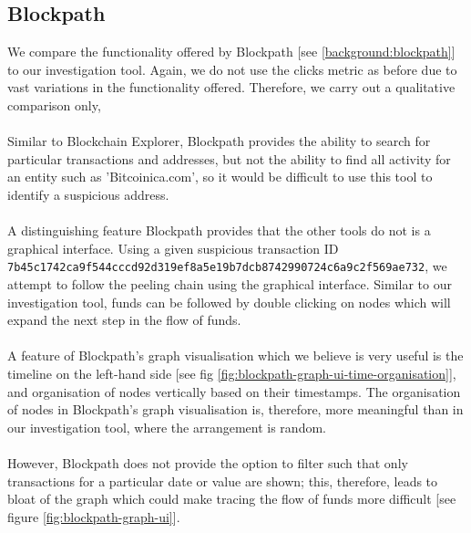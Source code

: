 \subsection{Blockpath}
We compare the functionality offered by Blockpath [see \ref{background:blockpath}] to our investigation tool. Again, we do not use the clicks metric as before due to vast variations in the functionality offered. Therefore, we carry out a qualitative comparison only,
\\\\
Similar to Blockchain Explorer, Blockpath provides the ability to search for particular transactions and addresses, but not the ability to find all activity for an entity such as 'Bitcoinica.com', so it would be difficult to use this tool to identify a suspicious address. 
\\\\
A distinguishing feature Blockpath provides that the other tools do not is a graphical interface. Using a given suspicious transaction ID \\\texttt{7b45c1742ca9f544cccd92d319ef8a5e19b7dcb8742990724c6a9c2f569ae732}, we attempt to follow the peeling chain using the graphical interface. Similar to our investigation tool, funds can be followed by double clicking on nodes which will expand the next step in the flow of funds. 
\\\\
A feature of Blockpath's graph visualisation which we believe is very useful is the timeline on the left-hand side [see fig \ref{fig:blockpath-graph-ui-time-organisation}], and organisation of nodes vertically based on their timestamps. The organisation of nodes in Blockpath's graph visualisation is, therefore, more meaningful than in our investigation tool, where the arrangement is random. 
\\\\
However, Blockpath does not provide the option to filter such that only transactions for a particular date or value are shown; this, therefore, leads to bloat of the graph which could make tracing the flow of funds more difficult [see figure \ref{fig:blockpath-graph-ui}]. 

